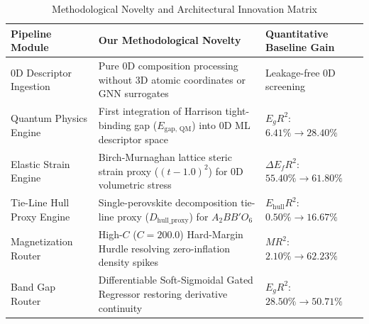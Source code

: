\documentclass[12pt,onecolumn]{elsarticle}
\begin{document}
\begin{table}[H]
\centering
\caption{Methodological Novelty and Architectural Innovation Matrix}
\label{tab:novelty_matrix}
\small
\begin{tabularx}{\textwidth}{p{} X >{\centering\arraybackslash}p{}}
\toprule
\textbf{Pipeline Module} & \textbf{Our Methodological Novelty} & \textbf{Quantitative Baseline Gain} \\
\midrule
0D Descriptor Ingestion & Pure 0D composition processing without 3D atomic coordinates or GNN surrogates & Leakage-free 0D screening \\
Quantum Physics Engine & First integration of Harrison tight-binding gap ($E_{\text{gap, QM}}$) into 0D ML descriptor space & $E_g R^2$: $6.41\% \to 28.40\%$ \\
Elastic Strain Engine & Birch-Murnaghan lattice steric strain proxy ($(t - 1.0)^2$) for 0D volumetric stress & $\Delta E_f R^2$: $55.40\% \to 61.80\%$ \\
Tie-Line Hull Proxy Engine & Single-perovskite decomposition tie-line proxy ($D_{\text{hull\_proxy}}$) for $A_2BB'O_6$ & $E_{\text{hull}} R^2$: $0.50\% \to 16.67\%$ \\
Magnetization Router & High-$C$ ($C=200.0$) Hard-Margin Hurdle resolving zero-inflation density spikes & $M R^2$: $2.10\% \to 62.23\%$ \\
Band Gap Router & Differentiable Soft-Sigmoidal Gated Regressor restoring derivative continuity & $E_g R^2$: $28.50\% \to 50.71\%$ \\
\bottomrule
\end{tabularx}
\end{table}
\end{document}
